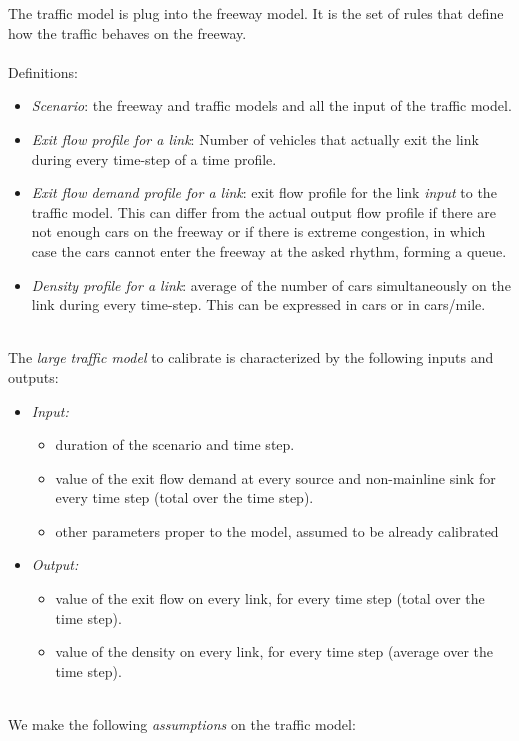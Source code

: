 The traffic model is plug into the freeway model. It is the set of rules that define how the traffic behaves on the freeway.\\
\\
Definitions:
\begin{itemize}	
	\item \emph{Scenario}: the freeway and traffic models and all the input of the traffic model.
	\item \emph{Exit flow profile for a link}: Number of vehicles that actually exit the link during every time-step of a time profile.
	\item \emph{Exit flow demand profile for a link}: exit flow profile for the link \emph{input} to the traffic model. This can differ from the actual output flow profile if there are not enough cars on the freeway or if there is extreme congestion, in which case the cars cannot enter the freeway at the asked rhythm, forming a queue.
	\item \emph{Density profile for a link}: average of the number of cars simultaneously on the link during every time-step. This can be expressed in cars or in cars/mile.
\end{itemize}
~\\
The \emph{large traffic model} to calibrate is characterized by the following inputs and outputs:
\begin{itemize}
	\item \emph{Input:} 
	\begin{itemize}
		\item   duration of the scenario and time step.
		\item   value of the exit flow demand at every source and non-mainline sink for every time step (total over the time step).
		\item	other parameters proper to the model, assumed to be already calibrated
	\end{itemize}
	\item \emph{Output:}
	\begin{itemize}
		\item   value of the exit flow on every link, for every time step (total over the time step).
		\item	value of the density on every link, for every time step (average over the time step).		
	\end{itemize}
\end{itemize}
~\\
We make the following \emph{assumptions} on the traffic model: 
